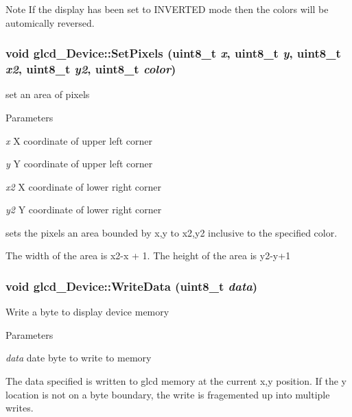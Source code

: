 \begin{DoxyNote}{Note}
If the display has been set to INVERTED mode then the colors will be automically reversed. 
\end{DoxyNote}
\hypertarget{classglcd___device_a4950fe109b27cb1cdcdbabe367d02c80}{
\subsubsection[{SetPixels}]{\setlength{\rightskip}{0pt plus 5cm}void glcd\_\-Device::SetPixels (uint8\_\-t {\em x}, \/  uint8\_\-t {\em y}, \/  uint8\_\-t {\em x2}, \/  uint8\_\-t {\em y2}, \/  uint8\_\-t {\em color})}}
\label{classglcd___device_a4950fe109b27cb1cdcdbabe367d02c80}
set an area of pixels


\begin{DoxyParams}{Parameters}
\item[{\em x}]X coordinate of upper left corner \item[{\em y}]Y coordinate of upper left corner \item[{\em x2}]X coordinate of lower right corner \item[{\em y2}]Y coordinate of lower right corner\end{DoxyParams}
sets the pixels an area bounded by x,y to x2,y2 inclusive to the specified color.

The width of the area is x2-\/x + 1. The height of the area is y2-\/y+1 \hypertarget{classglcd___device_a209d1ba245e7e02eb65e07c15ce0461d}{
\subsubsection[{WriteData}]{\setlength{\rightskip}{0pt plus 5cm}void glcd\_\-Device::WriteData (uint8\_\-t {\em data})}}
\label{classglcd___device_a209d1ba245e7e02eb65e07c15ce0461d}
Write a byte to display device memory


\begin{DoxyParams}{Parameters}
\item[{\em data}]date byte to write to memory\end{DoxyParams}
The data specified is written to glcd memory at the current x,y position. If the y location is not on a byte boundary, the write is fragemented up into multiple writes.

